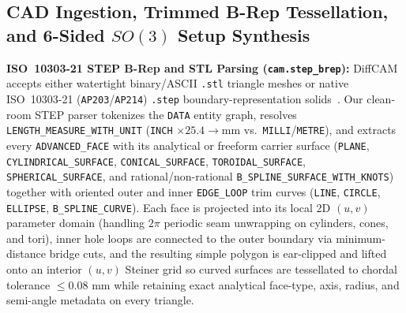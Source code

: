 \documentclass[conference]{IEEEtran}
\begin{document}
\subsection{CAD Ingestion, Trimmed B-Rep Tessellation, and 6-Sided $SO(3)$ Setup Synthesis}
\label{sec:cad_setup}
\textbf{ISO~10303-21 STEP B-Rep and STL Parsing (\texttt{cam.step\_brep}):}
DiffCAM accepts either watertight binary/ASCII \texttt{.stl} triangle meshes or native ISO~10303-21 (\texttt{AP203}/\texttt{AP214}) \texttt{.step} boundary-representation solids~\cite{iso10303step}. Our clean-room STEP parser tokenizes the \texttt{DATA} entity graph, resolves \texttt{LENGTH\_\allowbreak MEASURE\_\allowbreak WITH\_\allowbreak UNIT} (\texttt{INCH} $\times 25.4 \to \text{mm}$ vs.\ \texttt{MILLI}/\texttt{METRE}), and extracts every \texttt{ADVANCED\_\allowbreak FACE} with its analytical or freeform carrier surface (\texttt{PLANE}, \texttt{CYLINDRICAL\_\allowbreak SURFACE}, \texttt{CONICAL\_\allowbreak SURFACE}, \texttt{TOROIDAL\_\allowbreak SURFACE}, \texttt{SPHERICAL\_\allowbreak SURFACE}, and rational/non-rational \texttt{B\_\allowbreak SPLINE\_\allowbreak SURFACE\_\allowbreak WITH\_\allowbreak KNOTS}) together with oriented outer and inner \texttt{EDGE\_\allowbreak LOOP} trim curves (\texttt{LINE}, \texttt{CIRCLE}, \texttt{ELLIPSE}, \texttt{B\_\allowbreak SPLINE\_\allowbreak CURVE}). Each face is projected into its local 2D $(u,v)$ parameter domain (handling $2\pi$ periodic seam unwrapping on cylinders, cones, and tori), inner hole loops are connected to the outer boundary via minimum-distance bridge cuts, and the resulting simple polygon is ear-clipped and lifted onto an interior $(u,v)$ Steiner grid so curved surfaces are tessellated to chordal tolerance $\le 0.08\text{ mm}$ while retaining exact analytical face-type, axis, radius, and semi-angle metadata on every triangle.
\end{document}
